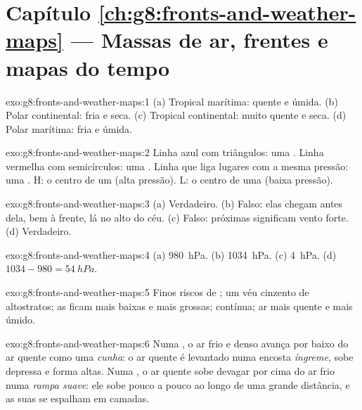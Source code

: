 \section*{Capítulo \ref{ch:g8:fronts-and-weather-maps} --- Massas de ar, frentes e mapas do tempo}

\begin{solution}{exo:g8:fronts-and-weather-maps:1}
(a) Tropical marítima: quente e úmida. (b) Polar continental: fria e
seca. (c) Tropical continental: muito quente e seca. (d) Polar marítima:
fria e úmida.
\end{solution}

\begin{solution}{exo:g8:fronts-and-weather-maps:2}
Linha azul com triângulos: uma . Linha vermelha com
semicírculos: uma . Linha que liga lugares com a mesma
pressão: uma . H: o centro de um  (alta pressão). L: o
centro de uma  (baixa pressão).
\end{solution}

\begin{solution}{exo:g8:fronts-and-weather-maps:3}
(a) Verdadeiro. (b) Falso: elas chegam antes dela, bem à frente, lá no
alto do céu. (c) Falso:  próximas significam vento forte.
(d) Verdadeiro.
\end{solution}

\begin{solution}{exo:g8:fronts-and-weather-maps:4}
(a) \qty{980}{hPa}. (b) \qty{1034}{hPa}. (c) \qty{4}{hPa}. (d) $1034 -
980 = \qty{54}{hPa}$.
\end{solution}

\begin{solution}{exo:g8:fronts-and-weather-maps:5}
Finos riscos de ; um véu cinzento de altostratos; as  ficam
mais baixas e mais grossas;  contínua; ar mais quente e mais úmido.
\end{solution}

\begin{solution}{exo:g8:fronts-and-weather-maps:6}
Numa , o ar frio e denso avança por baixo do ar quente como uma
\emph{cunha}: o ar quente é levantado numa encosta \emph{íngreme}, sobe
depressa e forma  altas. Numa , o ar quente sobe
devagar por cima do ar frio numa \emph{rampa suave}: ele sobe pouco a
pouco ao longo de uma grande distância, e as suas  se espalham em
camadas.
\end{solution}

